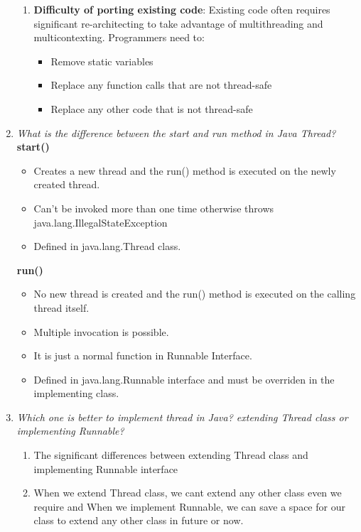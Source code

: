 \documentclass[11pt]{article}
\begin{document}
\begin{enumerate}
\begin{enumerate}
		      \item \textbf{Difficulty of porting existing code}: Existing code often requires significant re-architecting to take advantage of multithreading and multicontexting. Programmers need to:
		            \begin{itemize}
			            \item Remove static variables
			            \item Replace any function calls that are not thread-safe
			            \item Replace any other code that is not thread-safe
		            \end{itemize}
	      \end{enumerate}
	\item \textit{What is the difference between the start and run method in Java Thread? }\\
	      \textbf{start()}
	      \begin{itemize}
		      \item Creates a new thread and the run() method is executed on the newly created thread.
		      \item Can't be invoked more than one time otherwise throws java.lang.IllegalStateException
		      \item Defined in java.lang.Thread class.
	      \end{itemize}
	      \textbf{run()}
	      \begin{itemize}
		      \item No new thread is created and the run() method is executed on the calling thread itself.
		      \item Multiple invocation is possible.
		      \item It is just a normal function in Runnable Interface.
		      \item Defined in java.lang.Runnable interface and must be overriden in the implementing class.
	      \end{itemize}
	\item \textit{Which one is better to implement thread in Java? extending Thread class or implementing Runnable?}\\
	      \begin{enumerate}
		      \item The significant differences between extending Thread class and implementing Runnable interface
		      \item When we extend Thread class, we cant extend any other class even we require and When we implement Runnable, we can save a space for our class to extend any other class in future or now.

\end{enumerate}
\end{enumerate}
\end{document}
